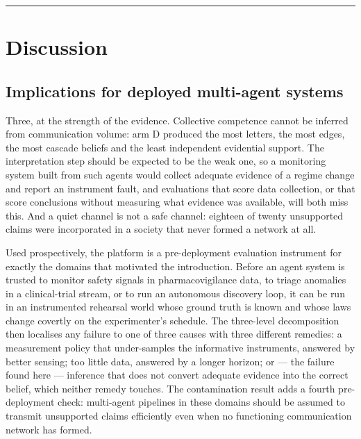 \documentclass[pdflatex,sn-basic]{sn-jnl}
\begin{document}
\begin{center}\rule{0.5\linewidth}{0.5pt}\end{center}

\hypertarget{discussion}{%
\section{Discussion}\label{discussion}}

\hypertarget{implications-for-deployed-multi-agent-systems}{%
\subsection{Implications for deployed multi-agent systems}\label{implications-for-deployed-multi-agent-systems}}

Three, at the strength of the evidence.
Collective competence cannot be inferred from communication volume: arm D produced the
most letters, the most edges, the most cascade beliefs and the least independent
evidential support. The interpretation step should be expected to be the weak one, so a
monitoring system built from such agents would collect adequate evidence of a regime
change and report an instrument fault, and evaluations that score data collection, or that
score conclusions without measuring what evidence was available, will both miss this. And
a quiet channel is not a safe channel: eighteen of twenty unsupported claims were
incorporated in a society that never formed a network at all.

Used prospectively, the platform is a pre-deployment evaluation instrument for exactly the
domains that motivated the introduction. Before an agent system is trusted to monitor safety
signals in pharmacovigilance data, to triage anomalies in a clinical-trial stream, or to run
an autonomous discovery loop, it can be run in an instrumented rehearsal world whose ground
truth is known and whose laws change covertly on the experimenter's schedule. The three-level
decomposition then localises any failure to one of three causes with three different
remedies: a measurement policy that under-samples the informative instruments, answered by
better sensing; too little data, answered by a longer horizon; or --- the failure found here ---
inference that does not convert adequate evidence into the correct belief, which neither
remedy touches. The contamination result adds a fourth pre-deployment check: multi-agent
pipelines in these domains should be assumed to transmit unsupported claims efficiently even
when no functioning communication network has formed.
\end{document}
